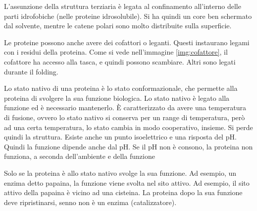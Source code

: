 
L'assunzione della struttura terziaria è legata al confinamento
all'interno delle parti idrofobiche (nelle proteine idrosolubile). Si ha
quindi un core ben schermato dal solvente, mentre le catene polari sono
molto distribuite sulla superficie.


Le proteine possono anche avere dei cofattori o leganti. Questi
instaurano legami con i residui della proteina.
Come si vede nell'immagine \ref{img:cofattore}, il cofattore ha accesso alla tasca, e quindi possono scambiare. Altri
sono legati durante il folding.



Lo stato nativo di una proteina è lo stato conformazionale, che permette alla proteina di svolgere la
sua funzione biologica.
Lo stato nativo è legato alla funzione ed è necessario mantenerlo.
È caratterizzato da avere una temperatura di fusione, ovvero lo stato
nativo si conserva per un range di temperatura, però ad una certa
temperatura, lo stato cambia in modo cooperativo, insieme. Si perde
quindi la struttura.
Esiste anche un punto isoelettrico e una risposta del pH. Quindi la
funzione dipende anche dal pH. Se il pH non è consono, la proteina non
funziona, a seconda dell'ambiente e della funzione

Solo se la proteina è allo stato nativo svolge la sua funzione. Ad
esempio, un enzima detto papaina, la funzione viene svolta nel sito
attivo.
Ad esempio, il sito attivo della papaina è vicino ad una cisteina. La
proteina dopo la sua funzione deve ripristinarsi, senno non è un enzima
(catalizzatore).

